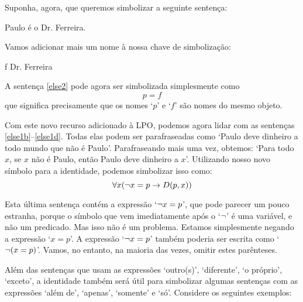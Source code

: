 Suponha, agora, que queremos simbolizar a seguinte sentença:
\begin{earg}
\item[\ex{else2}] Paulo é o Dr. Ferreira.
\end{earg}
Vamos adicionar mais um nome à nossa chave de simbolização:
	\begin{ekey}
		\item[f] Dr. Ferreira
	\end{ekey}
A sentença \ref{else2} pode agora ser simbolizada simplesmente como
$$p=f$$
que significa precisamente que os nomes `$p$' e `$f$' são nomes do mesmo objeto.

Com este novo recurso adicionado à LPO, podemos agora lidar com as sentenças \ref{else1b}--\ref{else1d}.
Todas elas podem ser parafraseadas como `Paulo deve dinheiro a todo mundo que não é Paulo'.
Parafraseando mais uma vez, obtemos:
`Para todo $x$, se $x$ não é Paulo, então Paulo deve dinheiro a $x$'.
Utilizando nosso novo símbolo para a identidade, podemos simbolizar isso como:
$$\forall x (\neg x = p \rightarrow \mathord{D}(p,x))$$

Esta última sentença contém a expressão `$\neg x = p$', que pode parecer um pouco estranha, porque o símbolo que vem imediatamente após o `$\neg$' é uma variável, e não um predicado.
Mas isso não é um problema.
Estamos simplesmente negando a expressão `$x = p$'.
A expressão `$\neg x = p$' também poderia ser escrita como `$\neg(x = p)$'.
Vamos, no entanto, na maioria das vezes, omitir estes parênteses.

Além das sentenças que usam as expressões `outro(s)', `diferente', `o próprio', `exceto', a identidade também será útil para simbolizar algumas sentenças com as expressões `além de', `apenas', `somente' e `só'.
Considere os seguintes exemplos:

